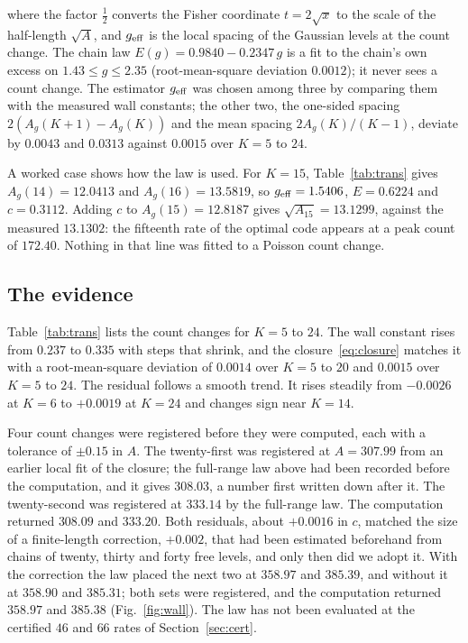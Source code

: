 \documentclass[journal]{IEEEtran}
\begin{document}
where the factor $\frac12$ converts the Fisher coordinate $t = 2\sqrt x$ to the scale of the half-length $\sqrt A$, and $g_{\rm eff}$
is the local spacing of the Gaussian levels at the count change. The chain law $E(g) = 0.9840 - 0.2347\,g$ is a fit to the chain's own
excess on $1.43 \le g \le 2.35$ (root-mean-square deviation $0.0012$); it never sees a count change. The estimator $g_{\rm eff}$ was
chosen among three by comparing them with the measured wall constants; the other two, the one-sided spacing $2(A_g(K + 1) - A_g(K))$
and the mean spacing $2A_g(K)/(K - 1)$, deviate by $0.0043$ and $0.0313$ against $0.0015$ over $K = 5$ to $24$.

A worked case shows how the law is used. For $K = 15$, Table~\ref{tab:trans} gives $A_g(14) = 12.0413$ and $A_g(16) = 13.5819$, so
$g_{\rm eff} = 1.5406$, $E = 0.6224$ and $c = 0.3112$. Adding $c$ to $A_g(15) = 12.8187$ gives $\sqrt{A_{15}} = 13.1299$, against the
measured $13.1302$: the fifteenth rate of the optimal code appears at a peak count of $172.40$. Nothing in that line was fitted to a
Poisson count change.

\subsection{The evidence}
Table~\ref{tab:trans} lists the count changes for $K = 5$ to $24$. The wall constant rises from $0.237$ to $0.335$ with steps that
shrink, and the closure~\eqref{eq:closure} matches it with a root-mean-square deviation of $0.0014$ over $K = 5$ to $20$ and $0.0015$
over $K = 5$ to $24$. The residual follows a smooth trend. It rises steadily from $-0.0026$ at $K = 6$ to $+0.0019$ at
$K = 24$ and changes sign near $K = 14$.

Four count changes were registered before they were computed, each with a tolerance of $\pm 0.15$ in $A$. The twenty-first was
registered at $A = 307.99$ from an earlier local fit of the closure; the full-range law above had been recorded before the computation,
and it gives $308.03$, a number first written down after it. The twenty-second was registered at $333.14$ by the full-range law. The
computation returned $308.09$ and $333.20$. Both residuals, about $+0.0016$ in $c$, matched the size of a finite-length
correction, $+0.002$, that had been estimated beforehand from chains of twenty, thirty and forty free levels, and only then did we
adopt it. With the correction the law placed the next two at $358.97$ and $385.39$, and without it at $358.90$ and $385.31$; both sets
were registered, and the computation returned $358.97$ and $385.38$ (Fig.~\ref{fig:wall}). The law has not been evaluated at the
certified $46$ and $66$ rates of Section~\ref{sec:cert}.
\end{document}
